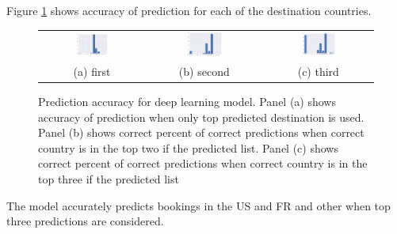 \documentclass[12pt]{article}
\begin{document}
Figure \ref{fig:pred_acc} shows accuracy of prediction for each of the destination countries. 
\begin{figure}
	\begin{tabular}{ccc}
	\includegraphics[width=0.33\textwidth]{pred_acc_1} & \includegraphics[width=0.33\textwidth]{pred_acc_2} & \includegraphics[width=0.33\textwidth]{pred_acc_3}\\
	(a) first  & (b) second & (c) third
	\end{tabular}
	\caption{Prediction accuracy for deep learning  model. Panel (a) shows accuracy of prediction when only top predicted destination is used. Panel (b) shows correct percent of correct predictions when correct country is in the top two if the predicted list. Panel (c) shows correct percent of correct predictions when correct country is in the top three if the predicted list}
	\label{fig:pred_acc}
\end{figure}
 The model accurately predicts bookings in the US and FR and other when top three predictions are considered. 
 
\end{document}
